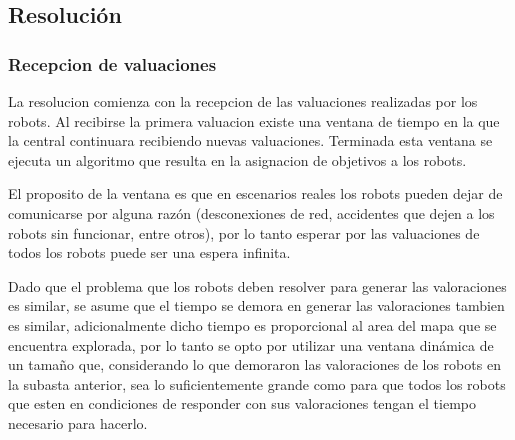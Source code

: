 


\subsection{Resolución} \label{subsec:MiResSub}

\subsubsection{Recepcion de valuaciones}
La resolucion comienza con la recepcion de las valuaciones realizadas por
los robots. Al recibirse la primera valuacion existe una ventana de tiempo en
la que la central continuara recibiendo nuevas valuaciones. Terminada esta
ventana se ejecuta un algoritmo que resulta en la asignacion de objetivos a
los robots.

El proposito de la ventana es que en escenarios reales los robots pueden dejar
de comunicarse por alguna razón (desconexiones de red, accidentes que dejen a
los robots sin funcionar, entre otros), por lo tanto esperar por las
valuaciones de todos los robots puede ser una espera infinita.

Dado que el problema que los robots deben resolver para generar las valoraciones es
similar, se asume que el tiempo se demora en generar las valoraciones tambien
es similar, adicionalmente dicho tiempo es proporcional al area del
mapa que se encuentra explorada, por lo tanto se opto por utilizar una ventana
dinámica de un tamaño que, considerando lo que demoraron las valoraciones de
los robots en la subasta anterior, sea lo suficientemente grande como para que
todos los robots que esten en condiciones de responder con sus valoraciones
tengan el tiempo necesario para hacerlo.

